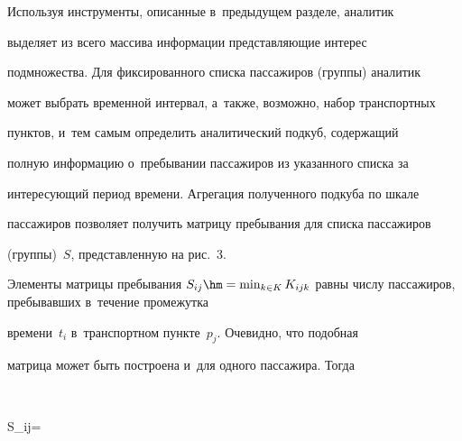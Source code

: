 \vspace*{-3pt}





      Используя инструменты, описанные в~предыдущем разделе, аналитик 


выделяет из всего массива информации представляющие интерес 


подмножества. Для фиксированного списка пассажиров (группы) аналитик 


может выбрать временной интервал, а~также, возможно, набор транспортных 


пунктов, и~тем самым определить аналитический подкуб, содержащий 


полную информацию о~пребывании пассажиров из указанного списка за 


интересующий период времени. Агрегация полученного подкуба по шкале 


пассажиров позволяет получить матрицу пребывания для списка пассажиров 


(группы)~$S$, представленную на рис.~3.











      Элементы матрицы пребывания $S_{ij}\hm= \min\nolimits_{k\in K} 


K_{ijk}$ равны числу пассажиров, пребывавших в~течение промежутка 


времени~$t_i$ в~транспортном пункте~$p_j$. Очевидно, что подобная 


матрица может быть построена и~для одного пассажира. Тогда 





\vspace*{-3pt}





\noindent


$$


S_{ij}=


